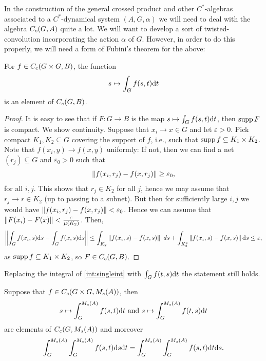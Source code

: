 In the construction of the general crossed product and other $C^*$-algebras associated to a $C^*$-dynamical system $(A,G,\alpha)$ we will need to deal with the algebra $C_c(G,A)$ quite a lot. We will want to develop a sort of twisted-convolution incorporating the action $\alpha$ of $G$. However, in order to do this properly, we will need a form of Fubini's theorem for the above:
\begin{lemma}
For $f \in C_c(G \times G  , B)$, the function
	\begin{align*}
		s \mapsto \int_G f(s,t) \mathrm{d} t
	\end{align*}
	is an element of $C_c(G,B)$.
	\label{int:singleint}
\end{lemma}
\begin{proof}
	It is easy to see that if $F \colon G \to B$ is the map $s \mapsto \int_G f(s,t) \mathrm{d} t$, then $ \operatorname{supp} F$ is compact. We show continuity. Suppose that $x_i \to x \in G$ and let $ \varepsilon > 0$. Pick compact $K_1,K_2 \subseteq G$ covering the support of $f$, i.e., such that $ \operatorname{supp} f \subseteq K_1 \times K_2$. Note that $f(x_i,y) \to f(x,y)$ uniformly: If not, then we can find a net $(r_j)\subseteq G$ and $\varepsilon_0 > 0$ such that
	\begin{align*}
		\left\lVert f(x_i,r_j) - f(x,r_j) \right\rVert \geq \varepsilon_0,
	\end{align*}
	for all $i,j$. This shows that $r_j \in K_2$ for all $j$, hence we may assume that $r_j \to r \in K_2$ (up to passing to a subnet). But then for sufficiently large $i,j$ we would have $\left\lVert f(x_i,r_j) - f(x,r_j) \right\rVert < \varepsilon_0$. Hence we can assume that $\left\lVert F(x_i) - F(x) \right\rVert < \frac{\varepsilon}{ \mu(K_2)}$. Then, 
	\begin{align*}
		\left\lVert \int_G f(x_i,s) \mathrm{d} s - \int_G f(x,s) \mathrm{d} s \right\rVert \leq \int_{K_2} \left\lVert f(x_i,s) - f(x,s) \right\rVert \ d s + \int_{K_2^c} \left\lVert f(x_i,s) - f(x,s) \right\rVert \mathrm{d} s  \leq \varepsilon,
	\end{align*}
	as $\operatorname{supp} f \subseteq K_1 \times K_2$, so $F \in C_c(G,B)$.
\end{proof}
\begin{corollary}
	Replacing the integral of \cref{int:singleint} with $\int_G f(t,s) \mathrm{d} t$ the statement still holds.
\end{corollary}
\begin{theorem}
	Suppose that $f \in C_c(G \times G, M_s(A))$, then 
	\begin{align*}
		s \mapsto \int_G^{M_s(A)} f(s,t) \mathrm{d} t \text{ and } s \mapsto \int_G^{M_s(A)} f(t,s) \mathrm{d} t
	\end{align*}
	are elements of $C_c(G,M_s(A))$ and moreover
	\begin{align*}
		\int_G^{M_s(A)} \int_G^{M_s(A)} f(s,t) \mathrm{d} s \mathrm{d} t = \int_G^{M_s(A)} \int_G^{M_s(A)} f(s,t) \mathrm{d} t \mathrm{d} s.
	\end{align*}
	\label{int:fubini}
\end{theorem}
